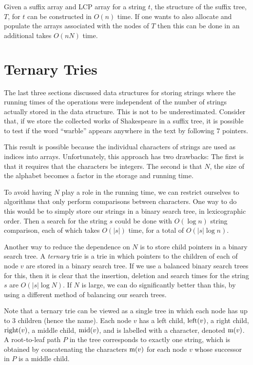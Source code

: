 \begin{thm}
  Given a suffix array and LCP array for a string $t$, the structure of the suffix tree, $T$, for $t$ can be constructed in $O(n)$ time.  If one wants to also allocate and populate the arrays associated with the nodes of $T$ then this can be done in an additional takes $O(nN)$ time.
\end{thm}


\section{Ternary Tries}

The last three sections discussed data structures for storing strings
where the running times of the operations were independent of the
number of strings actually stored in the data structure.  This is not
to be underestimated.  Consider that, if we store the collected works
of Shakespeare in a suffix tree, it is possible to test if the word
``warble'' appears anywhere in the text by following 7 pointers.

This result is possible because the individual characters of strings
are used as indices into arrays.  Unfortunately, this approach has
two drawbacks: The first is that it requires that the characters be
integers.  The second is that $N$, the size of the alphabet becomes a
factor in the storage and running time.

To avoid having $N$ play a role in the running time, we can restrict
ourselves to algorithms that only perform comparisons between
characters.  One way to do this would be to simply store our strings
in a binary search tree, in lexicographic order.  Then a search for
the string $s$ could be done with $O(\log n)$ string comparison, each
of which takes $O(|s|)$ time, for a total of $O(|s|\log n)$.

Another way to reduce the dependence on $N$ is to store child pointers
in a binary search tree.  A \emph{ternary} trie is a trie in which
pointers to the children of each of node $v$ are stored in a binary
search tree.  If we use a balanced binary search trees for this, then it
is clear that the insertion, deletion and search times for the string
$s$ are $O(|s|\log N)$.  If $N$ is large, we can do significantly
better than this, by using a different method of balancing our search
trees.

Note that a ternary trie can be viewed as a single tree in which each
node has up to 3 children (hence the name).  Each node $v$ has a left
child, $\mathrm{left}(v)$, a right child, $\mathrm{right}(v)$, a middle child, $\mathrm{mid}(v)$,
and is labelled with a character, denoted $\mathrm{m}(v)$.  A root-to-leaf path
$P$ in the tree corresponds to exactly one string, which is obtained by
concatenating the characters $\mathrm{m}(v)$ for each node $v$ whose successor
in $P$ is a middle child.

